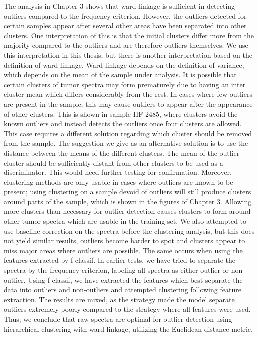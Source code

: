 The analysis in Chapter 3 shows that ward linkage is sufficient in detecting outliers compared to the frequency criterion. However, the outliers detected for certain samples appear after several other areas have been separated into other clusters. One interpretation of this is that the initial clusters differ more from the majority compared to the outliers and are therefore outliers themselves. We use this interpretation in this thesis, but there is another interpretation based on the definition of ward linkage. Ward linkage depends on the definition of variance, which depends on the mean of the sample under analysis. It is possible that certain clusters of tumor spectra may form prematurely due to having an inter cluster mean which differs considerably from the rest. In cases where few outliers are present in the sample, this may cause outliers to appear after the appearance of other clusters. This is shown in sample HF-2485, where clusters avoid the known outliers and instead detects the outliers once four clusters are allowed. This case requires a different solution regarding which cluster should be removed from the sample. The suggestion we give as an alternative solution is to use the distance between the means of the different clusters. The mean of the outlier cluster should be sufficiently distant from other clusters to be used as a discriminator. This would need further testing for confirmation. Moreover, clustering methods are only usable in cases where outliers are known to be present; using clustering on a sample devoid of outliers will still produce clusters around parts of the sample, which is shown in the figures of Chapter 3. Allowing more clusters than necessary for outlier detection causes clusters to form around other tumor spectra which are usable in the training set. We also attempted to use baseline correction on the spectra before the clustering analysis, but this does not yield similar results, outliers become harder to spot and clusters appear to miss major areas where outliers are possible. The same occurs when using the features extracted by f-classif. In earlier tests, we have tried to separate the spectra by the frequency criterion, labeling all spectra as either outlier or non-outlier.
 Using f-classif, we have extracted the features which best separate the data into outliers and non-outliers and attempted clustering following feature extraction. The results are mixed, as the strategy made the model separate outliers extremely poorly compared to the strategy where all features were used. Thus, we conclude that raw spectra are optimal for outlier detection using hierarchical clustering with ward linkage, utilizing the Euclidean distance metric.

